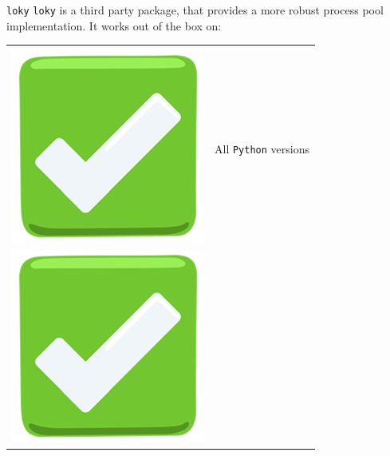 \documentclass[13pt, usenames,dvipsnames]{beamer} %
\newcommand{\mycode}[2][\tiny] {\texttt{#2}}
\begin{document}
    \begin{frame}[t]{\mycode[\small]{loky}}
        \vspace{1em}
        \mycode[\small]{loky} is a third party package, that provides a more
        robust process pool implementation. It works out of the box on:
        \begin{tabular}{m{0.5cm} m{10cm}}
            & \\
            \includegraphics[width=\linewidth] {media/green-tick-emoji.png} &
            All \mycode[\scriptsize]{Python} versions \\ \includegraphics[width=\linewidth] {media/green-tick-emoji.png} &

\end{tabular}
\end{frame}
\end{document}
